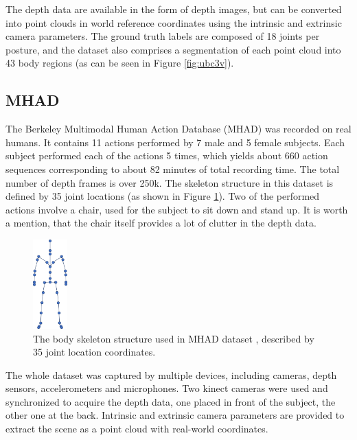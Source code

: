 \noindent
 The depth data are available in the form of depth images, but can be converted into point clouds in world reference coordinates using the intrinsic and extrinsic camera parameters. The ground truth labels are composed of 18 joints per posture, and the dataset also comprises a segmentation of each point cloud into 43 body regions (as can be seen in Figure \ref{fig:ubc3v}).

\subsection{MHAD}
The Berkeley Multimodal Human Action Database (MHAD) \cite{Vidal:2013:BMC:2478277.2478412} was recorded on real humans. It contains 11 actions performed by 7 male and 5 female subjects. Each subject performed each of the actions 5 times, which yields about 660 action sequences corresponding to about 82 minutes of total recording time. The total number of depth frames is over 250k. The skeleton structure in this dataset is defined by 35 joint locations (as shown in Figure \ref{fig:mhad_skeleton}). Two of the performed actions involve a chair, used for the subject to sit down and stand up. It is worth a mention, that the chair itself provides a lot of clutter in the depth data.\par

\vspace{5mm}
\begin{figure}[H]
\begin{center}
  \includegraphics[height=130px]{images/implementation/mhad_skeleton.png}
  \caption[The body skeleton structure used in MHAD dataset \cite{Vidal:2013:BMC:2478277.2478412}.]{The body skeleton structure used in MHAD dataset \cite{Vidal:2013:BMC:2478277.2478412}, described by 35 joint location coordinates.}
  \label{fig:mhad_skeleton}
\end{center}
\end{figure}

\noindent The whole dataset was captured by multiple devices, including cameras, depth sensors, accelerometers and microphones. Two kinect cameras were used and synchronized to acquire the depth data, one placed in front of the subject, the other one at the back. Intrinsic and extrinsic camera parameters are provided to extract the scene as a point cloud with real-world coordinates.\par

